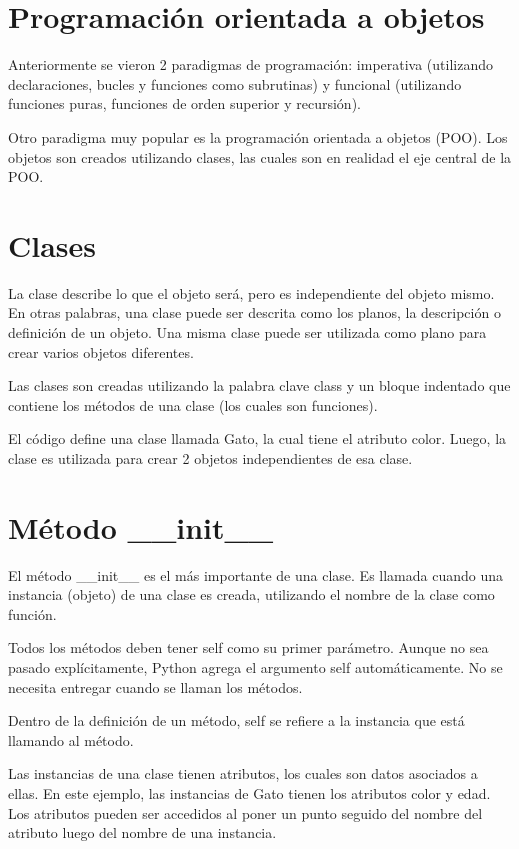 \documentclass{report}
\begin{document}

\section{Programación orientada a objetos}

Anteriormente se vieron 2 paradigmas de programación: imperativa (utilizando declaraciones, bucles y funciones como subrutinas) y funcional (utilizando funciones puras, funciones de orden superior y recursión).

Otro paradigma muy popular es la programación orientada a objetos (POO). Los objetos son creados utilizando clases, las cuales son en realidad el eje central de la POO.

\section{Clases}

La clase describe lo que el objeto será, pero es independiente del objeto mismo. En otras palabras, una clase puede ser descrita como los planos, la descripción o definición de un objeto. Una misma clase puede ser utilizada como plano para crear varios objetos diferentes.

Las clases son creadas utilizando la palabra clave class y un bloque indentado que contiene los métodos de una clase (los cuales son funciones).


El código define una clase llamada Gato, la cual tiene el atributo color. Luego, la clase es utilizada para crear 2 objetos independientes de esa clase.

\section{Método \_\_init\_\_}

El método \_\_init\_\_ es el más importante de una clase. Es llamada cuando una instancia (objeto) de una clase es creada, utilizando el nombre de la clase como función.

Todos los métodos deben tener self como su primer parámetro. Aunque no sea pasado explícitamente, Python agrega el argumento self automáticamente. No se necesita entregar cuando se llaman los métodos.

Dentro de la definición de un método, self se refiere a la instancia que está llamando al método.

Las instancias de una clase tienen atributos, los cuales son datos asociados a ellas. En este ejemplo, las instancias de Gato tienen los atributos color y edad. Los atributos pueden ser accedidos al poner un punto seguido del nombre del atributo luego del nombre de una instancia.
\end{document}
